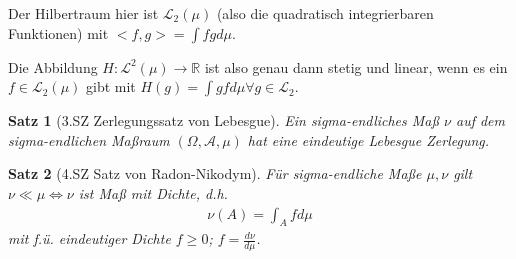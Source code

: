 \documentclass[]{article}
\newtheorem{theorem}{Satz}
\begin{document}
Der Hilbertraum hier ist $\mathcal{L}_2(\mu)$ (also die quadratisch integrierbaren Funktionen) mit $<f,g> = \int fg d\mu$.

Die Abbildung $H: \mathcal{L}^2(\mu) \rightarrow \mathbb{R}$ ist also genau dann stetig und linear, wenn es ein $f \in \mathcal{L}_2(\mu)$ gibt mit $H(g) = \int gf d\mu \forall g \in \mathcal{L}_2$.

\begin{theorem}[3.SZ Zerlegungssatz von Lebesgue]
	Ein sigma-endliches Maß $\nu$ auf dem sigma-endlichen Maßraum $(\Omega, \mathcal{A}, \mu)$ hat eine eindeutige Lebesgue Zerlegung.
\end{theorem}

\begin{theorem}[4.SZ Satz von Radon-Nikodym]
	Für sigma-endliche Maße $\mu,\nu$ gilt $\nu \ll \mu \iff \nu$ ist Maß mit Dichte, d.h.
	\begin{align*}
		\nu(A) = \int_A f d\mu
	\end{align*}
	mit f.ü. eindeutiger Dichte $f \geq 0$; $f = \frac{d\nu}{d\mu}$.
\end{theorem}
\end{document}
